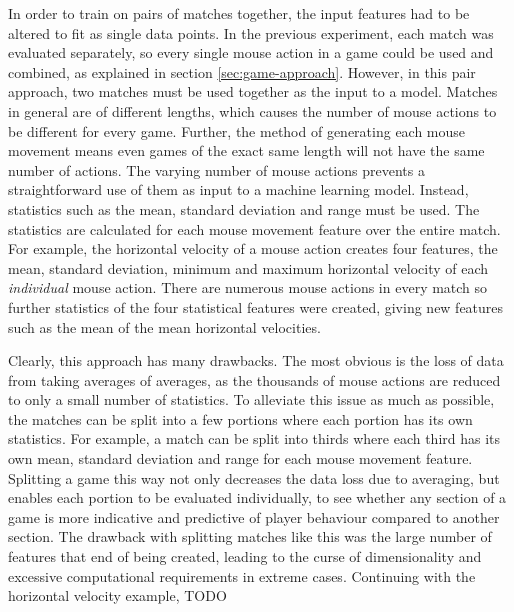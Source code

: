\documentclass[Report.tex]{subfiles}
\begin{document}
In order to train on pairs of matches together, the input features had to be altered to fit as single data points. In the previous experiment, each match was evaluated separately, so every single mouse action in a game could be used and combined, as explained in section \ref{sec:game-approach}. However, in this pair approach, two matches must be used together as the input to a model. Matches in general are of different lengths, which causes the number of mouse actions to be different for every game. Further, the method of generating each mouse movement means even games of the exact same length will not have the same number of actions. The varying number of mouse actions prevents a straightforward use of them as input to a machine learning model. Instead, statistics such as the mean, standard deviation and range must be used. The statistics are calculated for each mouse movement feature over the entire match. For example, the horizontal velocity of a mouse action creates four features, the mean, standard deviation, minimum and maximum horizontal velocity of each \textit{individual} mouse action. There are numerous mouse actions in every match so further statistics of the four statistical features were created, giving new features such as the mean of the mean horizontal velocities. 

Clearly, this approach has many drawbacks. The most obvious is the loss of data from taking averages of averages, as the thousands of mouse actions are reduced to only a small number of statistics. To alleviate this issue as much as possible, the matches can be split into a few portions where each portion has its own statistics. For example, a match can be split into thirds where each third has its own mean, standard deviation and range for each mouse movement feature. Splitting a game this way not only decreases the data loss due to averaging, but enables each portion to be evaluated individually, to see whether any section of a game is more indicative and predictive of player behaviour compared to another section. The drawback with splitting matches like this was the large number of features that end of being created, leading to the curse of dimensionality and excessive computational requirements in extreme cases. Continuing with the horizontal velocity example, TODO
\end{document}
